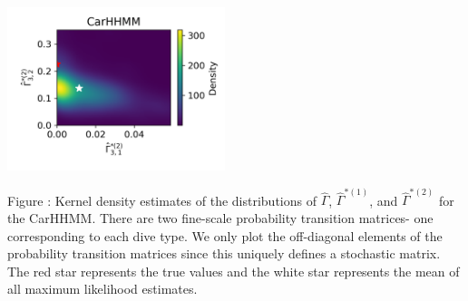 \documentclass{article}
\begin{document}
\begin{center}
        \includegraphics[width=2.5in]{../Plots/hhmm_V_Gamma_density_1_row_2.png}
        \end{center}
        
        \noindent Figure : Kernel density estimates of the distributions of $\hat \Gamma$, $\hat \Gamma^{*(1)}$, and $\hat \Gamma^{*(2)}$ for the CarHHMM. There are two fine-scale probability transition matrices- one corresponding to each dive type. We only plot the off-diagonal elements of the probability transition matrices since this uniquely defines a stochastic matrix. The red star represents the true values and the white star represents the mean of all maximum likelihood estimates.
        \addtocounter{fignum}{1}
        
        \newpage
\end{document}
